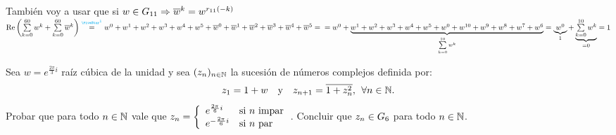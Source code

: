 \begin{enumerate}[label=\roman*)]
	      También voy a usar que si $w \en G_{11} \entonces \conj w^k = w^{r_{11}(-k)}$\\
	      $\re\parentesis{\sumatoria{k=0}{60}w^k +\sumatoria{k=0}{60}\conj w^k } \stackrel{\llamada1}=
		      w^0 + w^1 + w^2 + w^3 + w^4 + w^5 + \conj w^0 + \conj w^1 + \conj w^2 + \conj w^3 + \conj w^4 + \conj w^5 =\\
		      = w^0 + \ub{w^1 + w^2 + w^3 + w^4 + w^5 + w^0 + w^{10} + w^9 + w^8 + w^7 + w^6}{\sumatoria{k=0}{10} w^k} =
		      \ub{w^0}{1} + \ub{\sumatoria{k=0}{10} w^k}{= 0} = 1
	      $
\end{enumerate}


\ejercicio
Sea $w = e^{\frac{2\pi}{3}i}$ raíz cúbica de la unidad y sea $(z_n)_{n\en \naturales}$ la sucesión de números
complejos definida por:
\[
	z_1 = 1+w \quad \text{y} \quad z_{n+1} = \conj{1 + z_n^2},\, \paratodo n \en \naturales.
\]
Probar que para todo $n \en \naturales$ vale que
$z_n =
	\llave{ll}{
		e^{\frac{2\pi}{6}i}  & \text{si $n$ impar}\\
		e^{-\frac{2\pi}{6}i}  & \text{si $n$ par}
	}$. Concluir que $z_n \en G_6$ para todo $n \en \naturales$.

